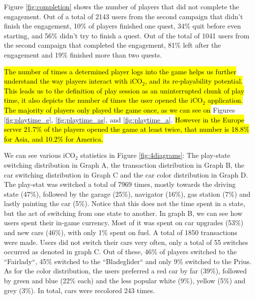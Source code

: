 \documentclass[preprint,authoryear,12pt]{elsarticle}
\newcommand{\hlc}[2][yellow]{ {\sethlcolor{#1} \hl{#2}} }
\begin{document}
Figure \ref{fig:completion} shows the number of players that did not complete the engagement. Out of a total of 2143 users from the second campaign that didn't finish the engagement, 10\% of players finished one quest, 34\% quit before even starting, and 56\% didn't try to finish a quest. Out of the total of 1041 users from the second campaign that completed the engagement, 81\% left after the engagement and 19\% finished more than two quests.


\hlc[green]
{The number of times a determined player logs into the game helps us further understand the way players interact with iCO$_2$, and its re-playability potential. This leads us to the definition of play session as an uninterrupted chunk of play time, it also depicts the number of times the user opened the iCO$_2$ application. The majority of players only played the game once, as we can see on }Figures \ref{fig:playtime_e}, \ref{fig:playtime_as}, and \ref{fig:playtime_a}. 
\hlc[green]{However in the Europe server 21.7\% of the players opened the  game at least twice, that number is 18.8\% for Asia, and 10.2\% for America.}





We can see various iCO$_2$ statistics in Figure \ref{fig:4diagrams}: The play-state switching distribution in Graph A, the transaction distribution in Graph B, the car switching distribution in Graph C and the car color distribution in Graph D. The play-stat was switched a total of 7969 times, mostly towards the driving state (47\%), followed by the garage (25\%), navigator (16\%), gas station (7\%) and lastly painting the car (5\%). Notice that this does not the time spent in a state, but the act of switching from one state to another. In graph B, we can see how users spent their in-game currency. Most of it was spent on car upgrades (53\%) and new cars (46\%), with only 1\% spent on fuel. A total of 1850 transactions were made. Users did not switch their cars very often, only a total of 55 switches occurred as denoted in graph C. Out of these, 46\% of players switched to the ``Fairlady``, 45\% switched to the ``Bladeglider`` and only 9\% switched to the Prius. As for the color distribution, the users preferred a red car by far (39\%), followed by green and blue (22\% each) and the less popular white (9\%), yellow (5\%) and grey (3\%). In total, cars were recolored 243 times.
\end{document}
